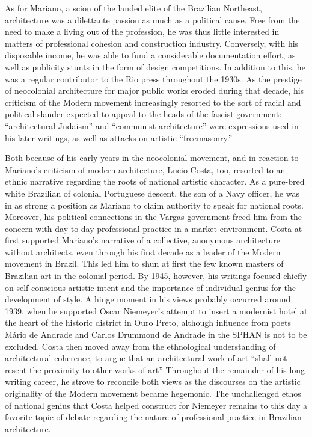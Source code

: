 As for Mariano, a scion of the landed elite of the Brazilian Northeast,
architecture was a dilettante passion as much as a political cause. Free
from the need to make a living out of the profession, he was thus little
interested in matters of professional cohesion and construction
industry. Conversely, with his disposable income, he was able to fund a
considerable documentation effort, as well as publicity stunts in the
form of design competitions. In addition to this, he was a regular
contributor to the Rio press throughout the 1930s. As the prestige of
neocolonial architecture for major public works eroded during that
decade, his criticism of the Modern movement increasingly resorted to
the sort of racial and political slander expected to appeal to the heads
of the fascist government: ``architectural Judaism'' and ``communist
architecture'' were expressions used in his later writings,
\autocite[p.~41]{mariannofilho:1943margem} as well as attacks on
artistic ``freemasonry.''

Both because of his early years in the neocolonial movement, and in
reaction to Mariano's criticism of modern architecture, Lucio Costa,
too, resorted to an ethnic narrative regarding the roots of national
artistic character. As a pure-bred white Brazilian of colonial
Portuguese descent, the son of a Navy officer, he was in as strong a
position as Mariano to claim authority to speak for national roots.
Moreover, his political connections in the Vargas government freed him
from the concern with day-to-day professional practice in a market
environment. Costa at first supported Mariano's narrative of a
collective, anonymous architecture without architects, even through his
first decade as a leader of the Modern movement in Brazil. This led him
to shun at first the few known masters of Brazilian art in the colonial
period. By 1945, however, his writings focused chiefly on self-conscious
artistic intent and the importance of individual genius for the
development of style. A hinge moment in his views probably occurred
around 1939, when he supported Oscar Niemeyer's attempt to insert a
modernist hotel at the heart of the historic district in Ouro Preto,
although influence from poets Mário de Andrade and Carlos Drummond de
Andrade in the SPHAN is not to be excluded. Costa then moved away from
the ethnological understanding of architectural coherence, to argue that
an architectural work of art ``shall not resent the proximity to other
works of art'' \autocite[quoted in][]{comas:2010passado} Throughout the
remainder of his long writing career, he strove to reconcile both views
as the discourses on the artistic originality of the Modern movement
became hegemonic. The unchallenged ethos of national genius that Costa
helped construct for Niemeyer remains to this day a favorite topic of
debate regarding the nature of professional practice in Brazilian
architecture.
